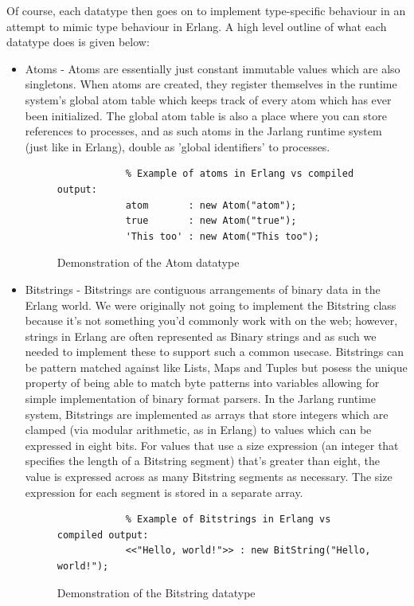 \documentclass[twoside,12pt,titlepage,a4paper]{article}
\begin{document}
Of course, each datatype then goes on to implement type-specific behaviour in an attempt to mimic type behaviour in Erlang. A high level outline of what each datatype does is given below:

\begin{itemize}
	\item Atoms - Atoms are essentially just constant immutable values which are also singletons. When atoms are created, they register themselves in the runtime system's global atom table which keeps track of every atom which has ever been initialized. The global atom table is also a place where you can store references to processes, and as such atoms in the Jarlang runtime system (just like in Erlang), double as 'global identifiers' to processes.
	\begin{figure}[H]
	\begin{verbatim}
	        % Example of atoms in Erlang vs compiled output:
	        atom       : new Atom("atom");
	        true       : new Atom("true");
	        'This too' : new Atom("This too");
	\end{verbatim}
	\caption{Demonstration of the Atom datatype}
	\end{figure}
	      			
	\item Bitstrings - Bitstrings are contiguous arrangements of binary data in the Erlang world. We were originally not going to implement the Bitstring class because it's not something you'd commonly work with on the web; however, strings in Erlang are often represented as Binary strings and as such we needed to implement these to support such a common usecase. Bitstrings can be pattern matched against like Lists, Maps and Tuples but posess the unique property of being able to match byte patterns into variables allowing for simple implementation of binary format parsers. In the Jarlang runtime system, Bitstrings are implemented as arrays that store integers which are clamped (via modular arithmetic, as in Erlang) to values which can be expressed in eight bits. For values that use a size expression (an integer that specifies the length of a Bitstring segment) that's greater than eight, the value is expressed across as many Bitstring segments as necessary. The size expression for each segment is stored in a separate array.
	\begin{figure}[H]
	\begin{verbatim}
	        % Example of Bitstrings in Erlang vs compiled output:
	        <<"Hello, world!">> : new BitString("Hello, world!");
	\end{verbatim}
	\caption{Demonstration of the Bitstring datatype}
	\end{figure}
	      			

\end{itemize}
\end{document}
